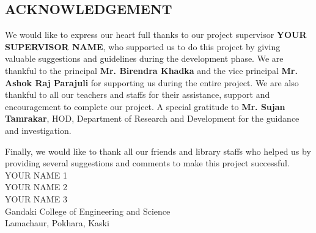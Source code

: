 \begin{center}
		\section*{ACKNOWLEDGEMENT}
	\end{center}
	
	We would like to express our heart full thanks to our project supervisor
\textbf{YOUR SUPERVISOR NAME}, who supported us to do this project by giving
valuable suggestions and guidelines during the development phase. We are
thankful to the principal \textbf{Mr. Birendra Khadka} and the vice principal \textbf{Mr. Ashok Raj Parajuli} for supporting us during the entire project. We are also thankful to all our teachers and staffs for their assistance, support and encouragement to complete our project. A special gratitude to \textbf{Mr. Sujan Tamrakar}, HOD, Department of Research and Development for the
guidance and investigation.

Finally, we would like to thank all our friends and library staffs who helped
us by providing several suggestions and comments to make this project
successful.\\

YOUR NAME 1\\
YOUR NAME 2\\
YOUR NAME 3\\
\vskip0.3cm
Gandaki College of Engineering and Science\\
Lamachaur, Pokhara, Kaski